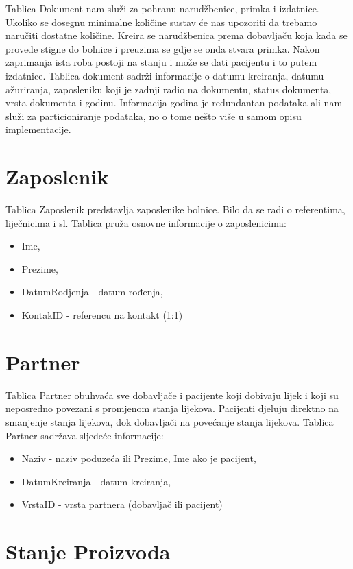 \documentclass[a4paper,12pt]{foi}
\begin{document}
Tablica Dokument nam služi za pohranu narudžbenice, primka i izdatnice. Ukoliko se dosegnu minimalne količine sustav će nas upozoriti da trebamo naručiti dostatne količine. Kreira se narudžbenica prema dobavljaču koja kada se provede stigne do bolnice i preuzima se gdje se onda stvara primka. Nakon zaprimanja ista roba postoji na stanju i može se dati pacijentu i to putem izdatnice. Tablica dokument sadrži informacije o datumu kreiranja, datumu ažuriranja, zaposleniku koji je zadnji radio na dokumentu, status dokumenta, vrsta dokumenta i godinu. Informacija godina je redundantan podataka ali nam služi za particioniranje podataka, no o tome nešto više u samom opisu implementacije.

\section{Zaposlenik}

Tablica Zaposlenik predstavlja zaposlenike bolnice. Bilo da se radi o referentima, liječnicima i sl. Tablica pruža osnovne informacije o zaposlenicima: 

\begin{itemize}
	\item Ime, 
	\item Prezime,
	\item DatumRodjenja - datum rođenja,
	\item KontakID - referencu na kontakt (1:1)
\end{itemize}

\section{Partner}

Tablica Partner obuhvaća sve dobavljače i pacijente koji dobivaju lijek i koji su neposredno povezani s promjenom stanja lijekova. Pacijenti djeluju direktno na smanjenje stanja lijekova, dok dobavljači na povećanje stanja lijekova. Tablica Partner sadržava sljedeće informacije: 

\begin{itemize}
	\item Naziv - naziv poduzeća ili Prezime, Ime ako je pacijent, 
	\item DatumKreiranja - datum kreiranja,
	\item VrstaID - vrsta partnera (dobavljač ili pacijent)
\end{itemize}

\section{Stanje Proizvoda}
\end{document}

